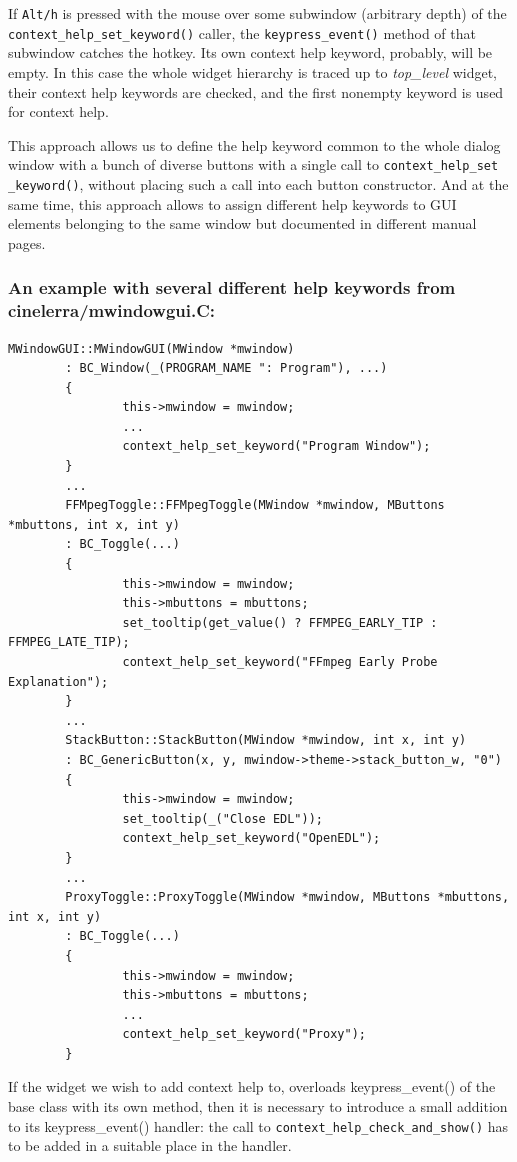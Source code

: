 If \texttt{Alt/h} is pressed with the mouse over some subwindow (arbitrary depth) of the \texttt{context\_help\_set\_keyword()} caller, the \texttt{keypress\_event()} method of that subwindow catches the hotkey. Its own context help keyword, probably, will be empty. In this case the whole widget hierarchy is traced up to \textit{top\_level} widget, their context help keywords are checked, and the first nonempty keyword is used for context help.

This approach allows us to define the help keyword common to the whole dialog window with a bunch of diverse buttons with a single call to \texttt{context\_help\_set \_keyword()}, without placing such a call into each button constructor. And at the same time, this approach allows to assign different help keywords to GUI elements belonging to the same window but documented in different manual pages.

\subsubsection{An example with several different help keywords from cinelerra/mwindowgui.C:}%
\label{ssub:exemple_different_help_keywords}

\begin{lstlisting}[style=sh]
        MWindowGUI::MWindowGUI(MWindow *mwindow)
        : BC_Window(_(PROGRAM_NAME ": Program"), ...)
        {
                this->mwindow = mwindow;
                ...
                context_help_set_keyword("Program Window");
        }
        ...
        FFMpegToggle::FFMpegToggle(MWindow *mwindow, MButtons *mbuttons, int x, int y)
        : BC_Toggle(...)
        {
                this->mwindow = mwindow;
                this->mbuttons = mbuttons;
                set_tooltip(get_value() ? FFMPEG_EARLY_TIP : FFMPEG_LATE_TIP);
                context_help_set_keyword("FFmpeg Early Probe Explanation");
        }
        ...
        StackButton::StackButton(MWindow *mwindow, int x, int y)
        : BC_GenericButton(x, y, mwindow->theme->stack_button_w, "0")
        {
                this->mwindow = mwindow;
                set_tooltip(_("Close EDL"));
                context_help_set_keyword("OpenEDL");
        }
        ...
        ProxyToggle::ProxyToggle(MWindow *mwindow, MButtons *mbuttons, int x, int y)
        : BC_Toggle(...)
        {
                this->mwindow = mwindow;
                this->mbuttons = mbuttons;
                ...
                context_help_set_keyword("Proxy");
        }
        \end{lstlisting}
If the widget we wish to add context help to, overloads keypress\_event() of the base class with its own method, then it is necessary to introduce a small addition to its keypress\_event() handler: the call to \texttt{context\_help\_check\_and\_show()} has to be added in a suitable place in the handler.

